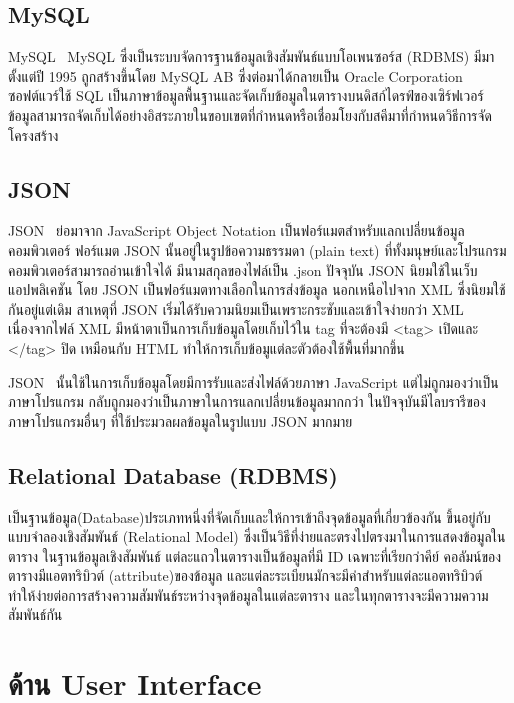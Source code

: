 \subsection{MySQL}
MySQL~ \cite{MySQL} MySQL ซึ่งเป็นระบบจัดการฐานข้อมูลเชิงสัมพันธ์แบบโอเพนซอร์ส (RDBMS) มีมาตั้งแต่ปี 1995 ถูกสร้างขึ้นโดย MySQL AB ซึ่งต่อมาได้กลายเป็น Oracle Corporation ซอฟต์แวร์ใช้ SQL เป็นภาษาข้อมูลพื้นฐานและจัดเก็บข้อมูลในตารางบนดิสก์ไดรฟ์ของเซิร์ฟเวอร์ ข้อมูลสามารถจัดเก็บได้อย่างอิสระภายในขอบเขตที่กำหนดหรือเชื่อมโยงกับสคีมาที่กำหนดวิธีการจัดโครงสร้าง

\subsection{JSON}
JSON~ \cite{1_JSON} ย่อมาจาก JavaScript Object Notation เป็นฟอร์แมตสำหรับแลกเปลี่ยนข้อมูลคอมพิวเตอร์
ฟอร์แมต JSON นั้นอยู่ในรูปข้อความธรรมดา (plain text) ที่ทั้งมนุษย์และโปรแกรมคอมพิวเตอร์สามารถอ่านเข้าใจได้ 
มีนามสกุลของไฟล์เป็น .json ปัจจุบัน JSON นิยมใช้ในเว็บแอปพลิเคชัน โดย JSON เป็นฟอร์แมตทางเลือกในการส่งข้อมูล นอกเหนือไปจาก XML ซึ่งนิยมใช้กันอยู่แต่เดิม 
สาเหตุที่ JSON เริ่มได้รับความนิยมเป็นเพราะกระชับและเข้าใจง่ายกว่า XML เนื่องจากไฟล์ XML มีหน้าตาเป็นการเก็บข้อมูลโดยเก็บไว้ใน tag
ที่จะต้องมี <tag> เปิดและ </tag> ปิด เหมือนกับ HTML ทำให้การเก็บข้อมูแต่ละตัวต้องใช้พื้นที่มากขึ้น

JSON~  \cite{2_JSON} นั้นใช้ในการเก็บข้อมูลโดยมีการรับและส่งไฟล์ด้วยภาษา JavaScript แต่ไม่ถูกมองว่าเป็นภาษาโปรแกรม กลับถูกมองว่าเป็นภาษาในการแลกเปลี่ยนข้อมูลมากกว่า 
ในปัจจุบันมีไลบรารีของภาษาโปรแกรมอื่นๆ ที่ใช้ประมวลผลข้อมูลในรูปแบบ JSON มากมาย

\subsection{Relational Database (RDBMS)}
เป็นฐานข้อมูล(Database)ประเภทหนึ่งที่จัดเก็บและให้การเข้าถึงจุดข้อมูลที่เกี่ยวข้องกัน ขึ้นอยู่กับแบบจำลองเชิงสัมพันธ์ (Relational Model) ซึ่งเป็นวิธีที่ง่ายและตรงไปตรงมาในการแสดงข้อมูลในตาราง ในฐานข้อมูลเชิงสัมพันธ์ แต่ละแถวในตารางเป็นข้อมูลที่มี ID เฉพาะที่เรียกว่าคีย์ คอลัมน์ของตารางมีแอตทริบิวต์ (attribute)ของข้อมูล และแต่ละระเบียนมักจะมีค่าสำหรับแต่ละแอตทริบิวต์ ทำให้ง่ายต่อการสร้างความสัมพันธ์ระหว่างจุดข้อมูลในแต่ละตาราง และในทุกตารางจะมีความความสัมพันธ์กัน


\section{ด้าน User Interface}


